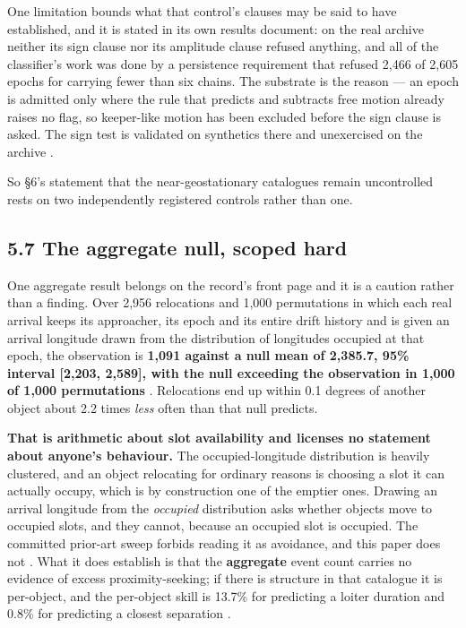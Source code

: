 \documentclass[11pt]{article}
\begin{document}
One limitation bounds what that control's clauses may be said to have established, and it is stated in its own results document: on the real archive neither its sign clause nor its amplitude clause refused anything, and all of the classifier's work was done by a persistence requirement that refused 2,466 of 2,605 epochs for carrying fewer than six chains. The substrate is the reason --- an epoch is admitted only where the rule that predicts and subtracts free motion already raises no flag, so keeper-like motion has been excluded before the sign clause is asked. The sign test is validated on synthetics there and unexercised on the archive%
.

So \S{}6's statement that the near-geostationary catalogues remain uncontrolled rests on two independently registered controls rather than one.

\subsection*{5.7 The aggregate null, scoped hard}

One aggregate result belongs on the record's front page and it is a caution rather than a finding. Over 2,956 relocations and 1,000 permutations in which each real arrival keeps its approacher, its epoch and its entire drift history and is given an arrival longitude drawn from the distribution of longitudes occupied at that epoch, the observation is \textbf{1,091 against a null mean of 2,385.7, 95\% interval [2,203, 2,589], with the null exceeding the observation in 1,000 of 1,000 permutations}%
. Relocations end up within 0.1 degrees of another object about 2.2 times \emph{less} often than that null predicts.

\textbf{That is arithmetic about slot availability and licenses no statement about anyone's behaviour.} The occupied-longitude distribution is heavily clustered, and an object relocating for ordinary reasons is choosing a slot it can actually occupy, which is by construction one of the emptier ones. Drawing an arrival longitude from the \emph{occupied} distribution asks whether objects move to occupied slots, and they cannot, because an occupied slot is occupied. The committed prior-art sweep forbids reading it as avoidance, and this paper does not%
. What it does establish is that the \textbf{aggregate} event count carries no evidence of excess proximity-seeking; if there is structure in that catalogue it is per-object, and the per-object skill is 13.7\% for predicting a loiter duration and 0.8\% for predicting a closest separation%
.
\end{document}
